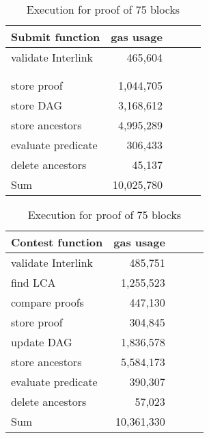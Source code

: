 \begin{table}[H]
    \centering
    \begin{tabular}{@{}lccll@{}}
        \toprule
        \multicolumn{1}{c}{\textbf{Submit function}} & \textbf{gas usage}    \\ \midrule
        validate Interlink  & \multicolumn{1}{r}{   465,604} \\
        \\
        \\
        store proof         & \multicolumn{1}{r}{ 1,044,705} \\
        store DAG           & \multicolumn{1}{r}{ 3,168,612} \\
        store ancestors     & \multicolumn{1}{r}{ 4,995,289} \\
        evaluate predicate  & \multicolumn{1}{r}{   306,433} \\
        delete ancestors    & \multicolumn{1}{r}{    45,137} \\
        \midrule
        Sum                 & \multicolumn{1}{r}{10,025,780} \\
        \bottomrule
    \end{tabular}
    \quad
    \begin{tabular}{@{}lccll@{}}
        \toprule
        \multicolumn{1}{c}{\textbf{Contest function}} & \textbf{gas usage} \\ \midrule
        validate Interlink  & \multicolumn{1}{r}{   485,751} \\
        find LCA            & \multicolumn{1}{r}{ 1,255,523} \\
        compare proofs      & \multicolumn{1}{r}{   447,130} \\
        store proof         & \multicolumn{1}{r}{   304,845} \\
        update DAG          & \multicolumn{1}{r}{ 1,836,578} \\
        store ancestors     & \multicolumn{1}{r}{ 5,584,173} \\
        evaluate predicate  & \multicolumn{1}{r}{   390,307} \\
        delete ancestors    & \multicolumn{1}{r}{    57,023} \\
        \midrule
        Sum                 & \multicolumn{1}{r}{10,361,330} \\
        \bottomrule
    \end{tabular}
    \caption{Execution for proof of 75 blocks}
    \label{table:old_gas_usage}
\end{table}
